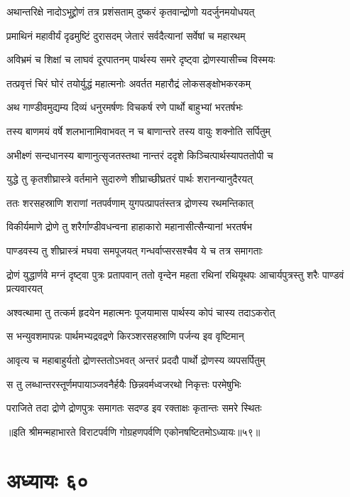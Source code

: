 \twolineshloka
{अथान्तरिक्षे नादोऽभूद्द्रोणं तत्र प्रशंसताम्}
{दुष्करं कृतवान्द्रोणो यदर्जुनमयोधयत्}


\twolineshloka
{प्रमाथिनं महावीर्यं दृढमुष्टिं दुरासदम्}
{जेतारं सर्वदैत्यानां सर्वेषां च महारथम्}


\twolineshloka
{अविभ्रमं च शिक्षां च लाघवं दूरपातनम्}
{पार्थस्य समरे दृष्ट्वा द्रोणस्यासीच्च विस्मयः}


\twolineshloka
{तत्प्रवृत्तं चिरं घोरं तयोर्युद्धं महात्मनोः}
{अवर्तत महारौद्रं लोकसङ्क्षोभकरकम्}


\twolineshloka
{अथ गाण्डीवमुद्यम्य दिव्यं धनुरमर्षणः}
{विचकर्ष रणे पार्थो बाहुभ्यां भरतर्षभः}


\twolineshloka
{तस्य बाणमयं वर्षे शलभानामिवाभवत्}
{न च बाणान्तरे तस्य वायुः शक्नोति सर्पितुम्}


\twolineshloka
{अभीक्ष्णं सन्दधानस्य बाणानुत्सृजतस्तथा}
{नान्तरं ददृशे किञ्चित्पार्थस्यापततोपी च}


\twolineshloka
{युद्धे तु कृतशीघ्रास्त्रे वर्तमाने सुदारुणे}
{शीघ्राच्छीघ्रतरं पार्थः शरानन्यानुदैरयत्}


\twolineshloka
{ततः शरसहस्राणि शराणां नतपर्वणाम्}
{युगपत्प्रापतंस्तत्र द्रोणस्य रथमन्तिकात्}


\twolineshloka
{विकीर्यमाणे द्रोणे तु शरैर्गाण्डीवधन्वना}
{हाहाकारो महानासीत्सैन्यानां भरतर्षभ}


\twolineshloka
{पाण्डवस्य तु शीघ्रास्त्रं मघवा समपूजयत्}
{गन्धर्वाप्सरसश्चैव ये च तत्र समागताः}


\threelineshloka
{द्रोणं युद्धार्णवे मग्नं दृष्ट्वा पुत्रः प्रतापवान्}
{ततो वृन्देन महता रथिनां रथियूथपः}
{आचार्यपुत्रस्तु शरैः पाण्डवं प्रत्यवारयत्}


\twolineshloka
{अश्वत्थामा तु तत्कर्म हृदयेन महात्मनः}
{पूजयामास पार्थस्य कोपं चास्य तदाऽकरोत्}


\twolineshloka
{स भन्युवशमापन्नः पार्थमभ्यद्रवद्रणे}
{किरञ्शरसहस्राणि पर्जन्य इव वृष्टिमान्}


\twolineshloka
{आवृत्य च महाबाहुर्यतो द्रोणस्ततोऽभवत्}
{अन्तरं प्रददौ पार्थो द्रोणस्य व्यपसर्पितुम्}


\twolineshloka
{स तु लब्धान्तरस्तूर्णमपायाञ्जवनैर्हयैः}
{छिन्नवर्मध्वजरथो निकृत्तः परमेषुभिः}


\twolineshloka
{पराजिते तदा द्रोणे द्रोणपुत्रः समागतः}
{सदण्ड इव रक्ताक्षः कृतान्तः समरे स्थितः}

॥इति श्रीमन्महाभारते विराटपर्वणि गोग्रहणपर्वणि एकोनषष्टितमोऽध्यायः॥५९॥

\chapter{अध्यायः ६०}

